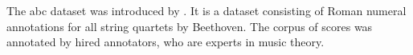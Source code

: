 
The \gls{abc} dataset was introduced by
\textcite{neuwirth2018annotated}. It is a dataset consisting
of Roman numeral annotations for all string quartets by
Beethoven. The corpus of scores was annotated by hired
annotators, who are experts in music theory. 

